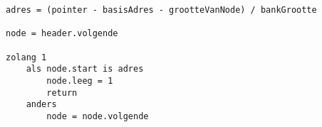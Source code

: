 \documentclass{uva-inf-article}
\begin{document}
\begin{lstlisting}
adres = (pointer - basisAdres - grootteVanNode) / bankGrootte

node = header.volgende

zolang 1
    als node.start is adres
        node.leeg = 1
        return
    anders
        node = node.volgende
\end{lstlisting}




\end{document}
